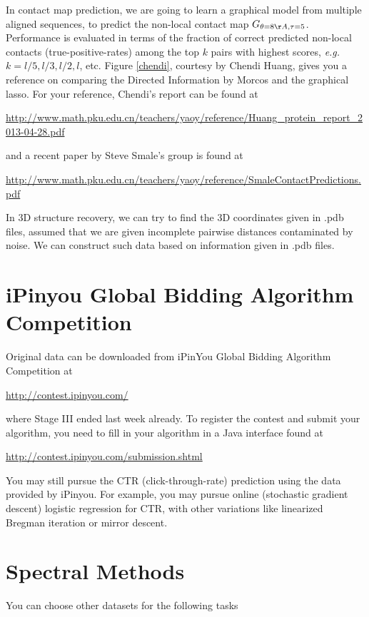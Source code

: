 \documentclass[11pt]{article}
\begin{document}
In contact map prediction, we are going to learn a graphical model from multiple aligned sequences, to predict the non-local contact map $G_{\theta=8\AA,\tau=5}$. Performance is evaluated in terms of the fraction of correct predicted non-local contacts (true-positive-rates) among the top $k$ pairs with highest scores, \emph{e.g.} $k=l/5, l/3, l/2, l$, etc. Figure \ref{chendi}, courtesy by Chendi Huang, gives you a reference on comparing the Directed Information by Morcos and the graphical lasso. For your reference, Chendi's report can be found at 

\url{http://www.math.pku.edu.cn/teachers/yaoy/reference/Huang_protein_report_2013-04-28.pdf} 

\noindent and a recent paper by Steve Smale's group is found at

\url{http://www.math.pku.edu.cn/teachers/yaoy/reference/SmaleContactPredictions.pdf} 


In 3D structure recovery, we can try to find the 3D coordinates given in .pdb files, assumed that we are given incomplete pairwise distances contaminated by noise. We can construct such
data based on information given in .pdb files.

\section{iPinyou Global Bidding Algorithm Competition}

Original data can be downloaded from iPinYou Global Bidding Algorithm Competition at 

\url{http://contest.ipinyou.com/}

\noindent where Stage III ended last week already. To register the contest and submit your algorithm, you need to fill in your algorithm in a Java interface found at

\url{http://contest.ipinyou.com/submission.shtml}

You may still pursue the CTR (click-through-rate) prediction using the data provided by iPinyou. For example, you may pursue online (stochastic gradient descent) logistic regression for CTR, with other variations like linearized Bregman iteration or mirror descent.   

\section{Spectral Methods}

You can choose other datasets for the following tasks
\end{document}

